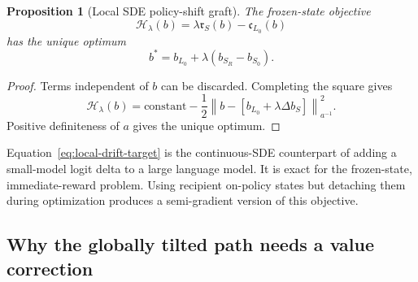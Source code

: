 \documentclass[11pt,a4paper]{article}
\newcommand{\norm}[1]{\left\lVert #1 \right\rVert}
\newcommand{\Sbase}{S_0}
\newcommand{\Srl}{S_R}
\newcommand{\Lbase}{L_0}
\newcommand{\dbS}{\Delta b_S}
\theoremstyle{plain}
\newtheorem{proposition}[theorem]{Proposition}
\theoremstyle{definition}
\begin{document}
\begin{proposition}[Local SDE policy-shift graft]
\label{prop:local-sde-graft}
The frozen-state objective
\begin{equation}
\mathcal H_\lambda(b)
=
\lambda\mathfrak r_S(b)-\mathfrak c_{\Lbase}(b)
\label{eq:local-hamiltonian}
\end{equation}
has the unique optimum
\begin{equation}
\boxed{
b^*
=
b_{\Lbase}
+\lambda(b_{\Srl}-b_{\Sbase}).
}
\label{eq:local-drift-target}
\end{equation}
\end{proposition}

\begin{proof}
Terms independent of $b$ can be discarded.  Completing the square gives
\[
\mathcal H_\lambda(b)
=
\mathrm{constant}
-\frac12
\norm{
b-[b_{\Lbase}+\lambda\dbS]
}_{a^{-1}}^2 .
\]
Positive definiteness of $a$ gives the unique optimum.
\end{proof}

Equation~\eqref{eq:local-drift-target} is the continuous-SDE counterpart of adding a small-model
logit delta to a large language model.  It is exact for the frozen-state, immediate-reward
problem.  Using recipient on-policy states but detaching them during optimization produces a
semi-gradient version of this objective.

\subsection{Why the globally tilted path needs a value correction}
\end{document}
